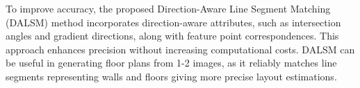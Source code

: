 To improve accuracy, the proposed Direction-Aware Line Segment Matching (DALSM) method incorporates direction-aware attributes, such as intersection angles and gradient directions, along with feature point correspondences. This approach enhances precision without increasing computational costs. DALSM can be useful in generating floor plans from 1-2 images, as it reliably matches line segments representing walls and floors giving more precise layout estimations.